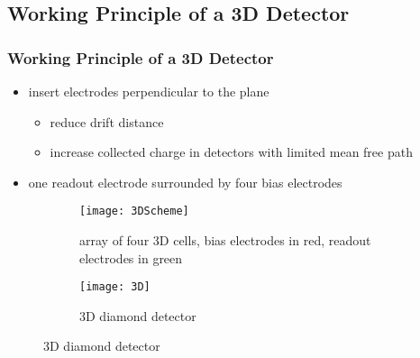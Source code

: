 \subsection{Working Principle of a 3D Detector}
\begin{frame}
	\frametitle{Working Principle of a 3D Detector}
	\begin{itemize}
		\setlength{\itemsep}{\fill}
		\item insert electrodes perpendicular to the plane
		\begin{itemize}
			\item reduce drift distance
			\item increase collected charge in detectors with limited mean free path %
		\end{itemize}
		\item one readout electrode surrounded by four bias electrodes
		
	\end{itemize}
	\begin{figure}
	  \centering
	  \begin{subfigure}[b]{0.45\textwidth}
		\centering
		\texttt{[image: 3DScheme]}
		\caption{array of four 3D cells, bias electrodes in red, readout electrodes in green}
	  \end{subfigure}
	  \begin{subfigure}[b]{0.45\textwidth}
		\centering
		\texttt{[image: 3D]}
		\caption{3D diamond detector}
	  \end{subfigure}
	\end{figure}
\end{frame}

